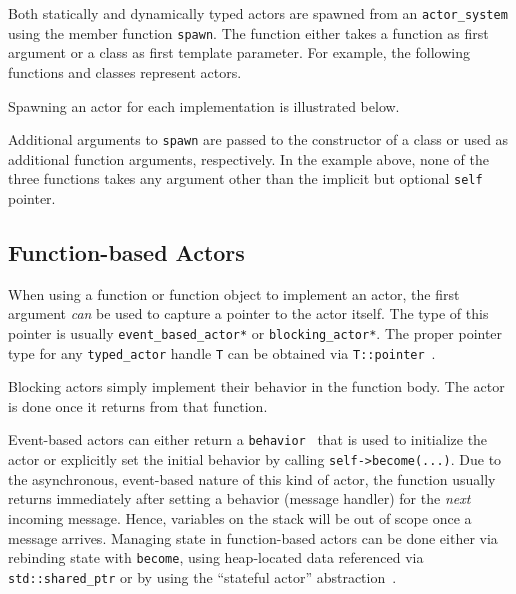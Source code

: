 Both statically and dynamically typed actors are spawned from an \lstinline^actor_system^ using the member function \lstinline^spawn^. The function either takes a function as first argument or a class as first template parameter. For example, the following functions and classes represent actors.



Spawning an actor for each implementation is illustrated below.



Additional arguments to \lstinline^spawn^ are passed to the constructor of a class or used as additional function arguments, respectively. In the example above, none of the three functions takes any argument other than the implicit but optional \lstinline^self^ pointer.

\subsection{Function-based Actors}
\label{function-based}

When using a function or function object to implement an actor, the first argument \emph{can} be used to capture a pointer to the actor itself.
The type of this pointer is usually \lstinline^event_based_actor*^ or \lstinline^blocking_actor*^.
The proper pointer type for any \lstinline^typed_actor^ handle \lstinline^T^ can be obtained via \lstinline^T::pointer^~.

Blocking actors simply implement their behavior in the function body. The actor is done once it returns from that function.

Event-based actors can either return a \lstinline^behavior^~ that is used to initialize the actor or explicitly set the initial behavior by calling \lstinline^self->become(...)^. Due to the asynchronous, event-based nature of this kind of actor, the function usually returns immediately after setting a behavior (message handler) for the \emph{next} incoming message. Hence, variables on the stack will be out of scope once a message arrives. Managing state in function-based actors can be done either via rebinding state with \lstinline^become^, using heap-located data referenced via \lstinline^std::shared_ptr^ or by using the ``stateful actor'' abstraction~.

